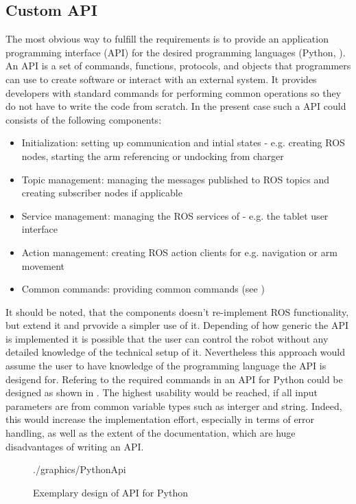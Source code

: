 \subsection{Custom API}
\label{sub:PyApi}
The most obvious way to fulfill the requirements is to provide an application programming interface (API) for the desired programming languages (Python, \Cpp{}). An API is a set of commands, functions, protocols, and objects that programmers can use to create software or interact with an external system. It provides developers with standard commands for performing common operations so they do not have to write the code from scratch. In the present case such a API could consists of the following components:

\begin{itemize}
	\item Initialization: setting up communication and intial states - e.g. creating ROS nodes, starting the arm referencing or undocking from charger
	\item Topic management: managing the messages published to ROS topics and creating subscriber nodes if applicable
	\item Service management: managing the ROS services of \hobbit{} - e.g. the tablet user interface
	\item Action management: creating ROS action clients for e.g. navigation or arm movement
	\item Common commands: providing common commands (see )
\end{itemize}

It should be noted, that the components doesn't re-implement ROS functionality, but extend it and prvovide a simpler use of it. Depending of how generic the API is implemented it is possible that the user can control the robot without any detailed knowledge of the technical setup of it. Nevertheless this approach would assume the user to have knowledge of the programming language the API is desigend for. Refering to the required commands in  an API for Python could be designed as shown in . The highest usability would be reached, if all input parameters are from common variable types such as interger and string. Indeed, this would increase the implementation effort, especially in terms of error handling, as well as the extent of the documentation,  which are huge disadvantages of writing an API. \\

\begin{figure}[htbp]
	\centering
	\begin{overpic}[width=0.8\linewidth]{./graphics/PythonApi}
	\end{overpic}
	\caption{Exemplary design of API for Python}%
	\label{fig:PythonApi}%
\end{figure}

